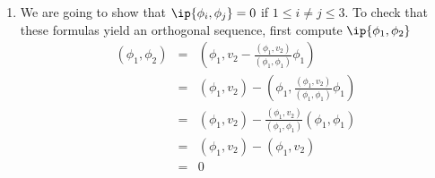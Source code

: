 \begin{solution}
\begin{enumerate}

\item We are going to show that $\ip{\phi_i, \phi_j}=0$ if $1 \leq i \neq j\leq 3$. To check that these formulas yield an orthogonal sequence, first compute $\ip{\phi_1, \phi_2}$ 
\begin{eqnarray*}
\left({ \phi}_1, {\phi}_2\right) &=& \left({ \phi}_1,  {v}_2-\frac{({ \phi}_1, { v}_2)}{({ \phi}_1, { \phi}_1)} { \phi}_1\right) \\
                                 &=& \left({ \phi}_1, { v}_2\right)- \left({ \phi}_1 ,\frac{({ \phi}_1, { v}_2)}{({ \phi}_1, { \phi}_1)} { \phi}_1\right) \\ 
                                 &=&\left({ \phi}_1, { v}_2\right)- \frac{({ \phi}_1, { v}_2)}{({ \phi}_1, { \phi}_1)}\left({ \phi}_1 ,{ \phi}_1\right) \\ 
                                 &=&\left({ \phi}_1, { v}_2\right)- \left({ \phi}_1, { v}_2\right)\\
                                 &=& 0
                                 
\end{eqnarray*}


\end{enumerate}
\end{solution}
